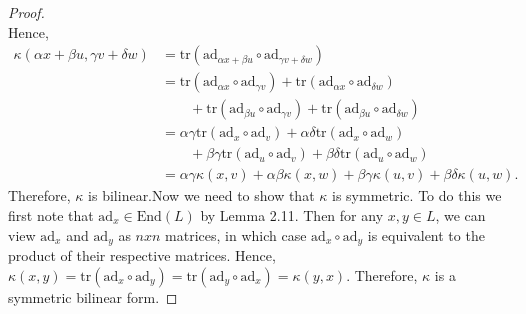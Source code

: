 \documentclass[12pt]{article}
\theoremstyle{definition}
\begin{document}
\begin{enumerate}
\begin{enumerate}[label=(\alph*)]
\begin{proof}
\begin{equation*}
                        \end{equation*}
                        Hence, 
                        \begin{equation*}
                            \begin{split}
                                \kappa(\alpha x+\beta u, \gamma v+\delta w) &=
                                \text{tr}(\text{ad}_{\alpha x+\beta
                                u}\circ\text{ad}_{\gamma v+\delta w}) \\
                                &= \text{tr}(\text{ad}_{\alpha
                                x}\circ\text{ad}_{\gamma
                                v})+\text{tr}(\text{ad}_{\alpha
                                x}\circ\text{ad}_{\delta w})\\&\quad\quad
                                +\text{tr}(\text{ad}_{\beta
                                u}\circ\text{ad}_{\gamma
                                v})+\text{tr}(\text{ad}_{\beta
                                u}\circ\text{ad}_{\delta w}) \\
                                &=\alpha\gamma\text{tr}(\text{ad}_x\circ\text{ad}_v)
                                +\alpha\delta\text{tr}(\text{ad}_{x}\circ\text{ad}_w)
                                \\
                                &\quad\quad
                                +\beta\gamma\text{tr}(\text{ad}_u\circ\text{ad}_v)
                                +\beta\delta\text{tr}(\text{ad}_u\circ\text{ad}_w)
                                \\
                                &=\alpha\gamma\kappa(x, v)+\alpha\beta\kappa(x,
                                w)+\beta\gamma\kappa(u,
                                v)+\beta\delta\kappa(u, w).
                            \end{split}
                        \end{equation*}
                        Therefore, $\kappa$ is bilinear.\newline Now we need to show that $\kappa$ is symmetric. To do this we first note that $\text{ad}_x\in\text{End}(L)$ by Lemma 2.11. Then for any $x, y\in L$, we can view $\text{ad}_x$ and $\text{ad}_y$ as $nxn$ matrices, in which case $\text{ad}_x\circ\text{ad}_y$ is equivalent to the product of their respective matrices. Hence, $\kappa(x, y)=\text{tr}(\text{ad}_x\circ\text{ad}_y)=\text{tr}(\text{ad}_y\circ\text{ad}_x)=\kappa(y,x)$. Therefore, $\kappa$ is a symmetric bilinear form.
                    \end{proof}

\end{enumerate}
\end{enumerate}
\end{document}
